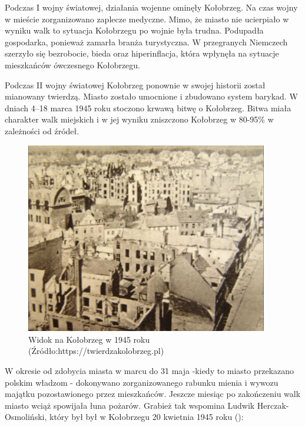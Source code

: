 \documentclass{amuthesis}
\begin{document}
Podczas I wojny światowej, działania wojenne ominęły Kołobrzeg.
Na czas wojny w mieście zorganizowano zaplecze medyczne.
Mimo, że miasto nie ucierpiało w wyniku walk to sytuacja Kołobrzegu po wojnie była trudna.
Podupadła gospodarka, ponieważ zamarła branża turystyczna.
W przegranych Niemczech szerzyło się bezrobocie, bieda oraz hiperinflacja, która wpłynęła na sytuacje mieszkańców ówczesnego Kołobrzegu.

Podczas II wojny światowej Kołobrzeg ponownie w swojej historii został mianowany twierdzą.
Miasto zostało umocnione i zbudowano system barykad.
W dniach 4--18 marca 1945 roku stoczono krwawą bitwę o Kołobrzeg.
Bitwa miała charakter walk miejskich i w jej wyniku zniszczono Kołobrzeg w 80-95\% w zależności od źródeł.

\begin{figure}[t]

{\centering \includegraphics[width=400px]{figures/kolobrzeg_wojna} 

}

\caption{Widok na Kołobrzeg w 1945 roku (Źródło:https://twierdzakolobrzeg.pl)}\label{fig:ryc4}
\end{figure}

W okresie od zdobycia miasta w marcu do 31 maja -kiedy to miasto przekazano polskim władzom - dokonywano zorganizowanego rabunku mienia i wywozu majątku pozostawionego przez mieszkańców.
Jeszcze miesiąc po zakończeniu walk miasto wciąż spowijała łuna pożarów.
Grabież tak wspomina Ludwik Herczak-Osmoliński, który był był w Kołobrzegu 20 kwietnia 1945 roku (\textcite{kołobrzeg_cytat}):
\end{document}
